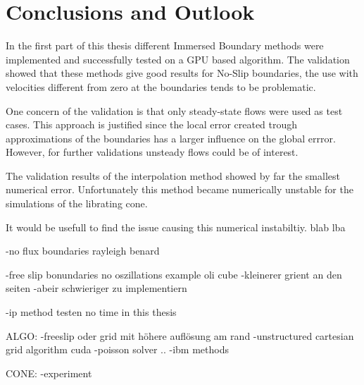\chapter{Conclusions and Outlook}

In the first part of this thesis different Immersed Boundary methods were
implemented and successfully tested on a GPU based algorithm.
The validation showed that these methods give good results for No-Slip boundaries,
the use with velocities different from zero at the boundaries tends to be problematic.

One concern of the validation is that only steady-state flows were used as test cases.
This approach is justified since the local error created trough approximations of the boundaries
has a larger influence on the global errror.
However, for further validations unsteady flows could be of interest.

The validation results of the interpolation method showed by far the smallest numerical error.
Unfortunately this method became numerically unstable for the simulations of the librating cone.

It would be usefull to find the issue causing this numerical instabiltiy. blab lba


-no flux boundaries rayleigh benard

-free slip bonundaries no oszillations  example oli cube
-kleinerer grient an den seiten
-abeir schwieriger zu implementiern

-ip method testen no time in this thesis


ALGO:
-freeslip oder grid mit höhere auflösung am rand
-unstructured cartesian grid algorithm cuda
-poisson solver ..
-ibm methods


CONE:
-experiment

